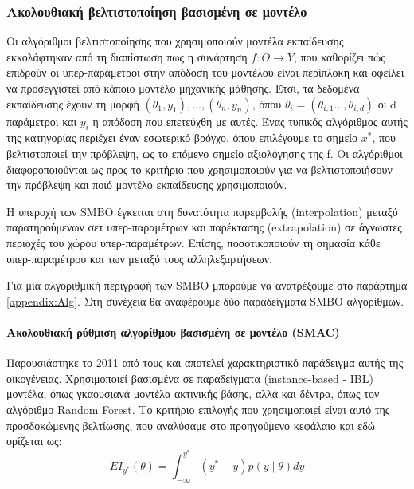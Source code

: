  \subsubsection{Ακολουθιακή βελτιστοποίηση βασισμένη σε μοντέλο} \label{section:SMBO}
 Οι αλγόριθμοι βελτιστοποίησης που χρησιμοποιούν μοντέλα εκπαίδευσης εκκολάφτηκαν από τη διαπίστωση πως η συνάρτηση $f: \Theta \rightarrow Y$, που καθορίζει πώς επιδρούν οι υπερ-παράμετροι στην απόδοση του μοντέλου είναι περίπλοκη και οφείλει να προσεγγιστεί από κάποιο μοντέλο μηχανικής μάθησης. Έτσι, τα δεδομένα εκπαίδευσης έχουν τη μορφή ${(\theta_1,y_1),...,(\theta_n,y_n)}$, όπου $\theta_i=(\theta_{i,1}..., \theta_{i,d})$ οι d παράμετροι και $y_i$ η απόδοση που επετεύχθη με αυτές. Ένας τυπικός αλγόριθμος αυτής της κατηγορίας περιέχει έναν εσωτερικό βρόγχο, όπου επιλέγουμε το σημείο $x^*$, που βελτιστοποιεί την πρόβλεψη, ως το επόμενο σημείο αξιολόγησης της f. Οι αλγόριθμοι διαφοροποιούνται ως προς το κριτήριο που χρησιμοποιούν για να βελτιστοποιήσουν την πρόβλεψη και ποιό μοντέλο εκπαίδευσης χρησιμοποιούν.
 
 Η υπεροχή των \gls{SMBO} έγκειται στη δυνατότητα παρεμβολής (interpolation) μεταξύ παρατηρούμενων σετ υπερ-παραμέτρων και παρέκτασης (extrapolation) σε άγνωστες περιοχές του χώρου υπερ-παραμέτρων. Επίσης, ποσοτικοποιούν τη σημασία κάθε υπερ-παραμέτρου και των μεταξύ τους αλληλεξαρτήσεων. 
 
 Για μία αλγοριθμική περιγραφή των SMBO μπορούμε να ανατρέξουμε στο παράρτημα \ref{appendix:Alg}. Στη συνέχεια θα αναφέρουμε δύο παραδείγματα SMBO αλγορίθμων.
 
 \paragraph{Ακολουθιακή ρύθμιση αλγορίθμου βασισμένη σε μοντέλο (SMAC)} Παρουσιάστηκε το 2011 από τους \citet{Hutter2011} και αποτελεί χαρακτηριστικό παράδειγμα αυτής της οικογένειας. Χρησιμοποιεί  βασισμένα σε παραδείγματα (instance-based - \gls{IBL}) μοντέλα, όπως γκαουσιανά  μοντέλα ακτινικής βάσης, αλλά και δέντρα, όπως τον αλγόριθμο Random Forest. Το κριτήριο επιλογής που χρησιμοποιεί είναι αυτό της προσδοκώμενης βελτίωσης, που αναλύσαμε στο προηγούμενο κεφάλαιο και εδώ ορίζεται ως:
 \begin{equation}
EI_{y^*} (\theta)= \int_{- \infty}^{y^*} (y^* - y) p(y \mid \theta) dy
 \end{equation}
